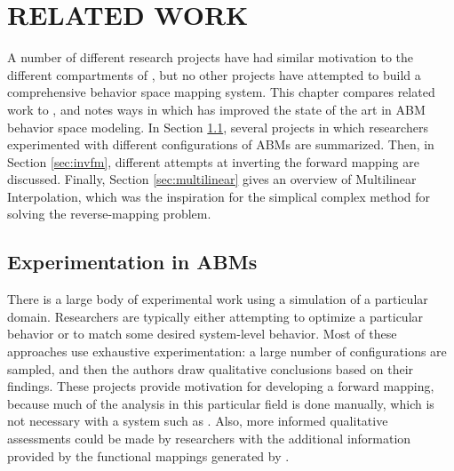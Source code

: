\chapter{RELATED WORK}
\thispagestyle{plain}

\label{RelatedWork}

A number of different research projects have had similar motivation to the different compartments of \fw, but no other projects have attempted to build a comprehensive behavior space mapping system.
This chapter compares related work to \fw, and notes ways in which \fw has improved the state of the art in ABM behavior space modeling.
In Section \ref{sec:abmexp}, several projects in which researchers experimented with different configurations of ABMs are summarized.
Then, in Section \ref{sec:invfm}, different attempts at inverting the forward mapping are discussed.
Finally, Section \ref{sec:multilinear} gives an overview of Multilinear Interpolation, which was the inspiration for the simplical complex method for solving the reverse-mapping problem.

\section{Experimentation in ABMs}
\label{sec:abmexp}

There is a large body of experimental work using a simulation of a particular domain.
Researchers are typically either attempting to optimize a particular behavior or to match some desired system-level behavior.
Most of these approaches use exhaustive experimentation: a large number of configurations are sampled, and then the authors draw qualitative conclusions based on their findings.
These projects provide motivation for developing a forward mapping, because much of the analysis in this particular field is done manually, which is not necessary with a system such as \fw.
Also, more informed qualitative assessments could be made by researchers with the additional information provided by the functional mappings generated by \fw.

